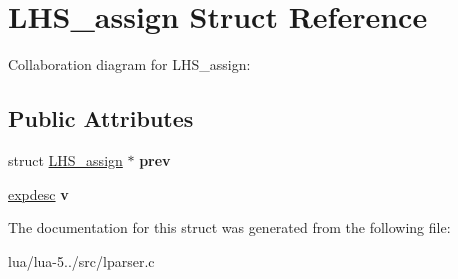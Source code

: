 \hypertarget{struct_l_h_s__assign}{\section{L\+H\+S\+\_\+assign Struct Reference}
\label{struct_l_h_s__assign}
}


Collaboration diagram for L\+H\+S\+\_\+assign\+:
\subsection*{Public Attributes}
\begin{DoxyCompactItemize}
\item 
\hypertarget{struct_l_h_s__assign_a05171fa435f605ea11a19b4a4f9532af}{struct \hyperlink{struct_l_h_s__assign}{L\+H\+S\+\_\+assign} $\ast$ {\bfseries prev}}\label{struct_l_h_s__assign_a05171fa435f605ea11a19b4a4f9532af}

\item 
\hypertarget{struct_l_h_s__assign_a7754c9ff563c4159cabc2488e05cfecc}{\hyperlink{structexpdesc}{expdesc} {\bfseries v}}\label{struct_l_h_s__assign_a7754c9ff563c4159cabc2488e05cfecc}

\end{DoxyCompactItemize}


The documentation for this struct was generated from the following file\+:\begin{DoxyCompactItemize}
\item 
lua/lua-\/5../src/lparser.\+c\end{DoxyCompactItemize}
